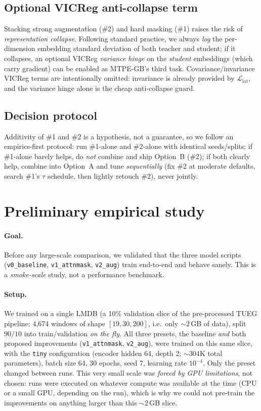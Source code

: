 \documentclass[11pt]{article}
\newcommand{\Llat}{\mathcal{L}_{\mathrm{lat}}}
\begin{document}
\subsection{Optional VICReg anti-collapse term}
Stacking strong augmentation (\#2) and hard masking (\#1) raises the risk of
\emph{representation collapse}. Following standard practice, we always
\emph{log} the per-dimension embedding standard deviation of both teacher and
student; if it collapses, an optional VICReg \emph{variance hinge} on the
\emph{student} embeddings (which carry gradient) can be enabled as MTPE-GB's third
task. Covariance/invariance VICReg terms are intentionally omitted: invariance is
already provided by \(\Llat\), and the variance hinge alone is the cheap
anti-collapse guard.

\subsection{Decision protocol}
Additivity of \#1 and \#2 is a hypothesis, not a guarantee, so we follow an
empirics-first protocol: run \#1-alone and \#2-alone with identical
seeds/splits; if \#1-alone barely helps, do \emph{not} combine and ship Option~B
(\#2); if both clearly help, combine into Option~A and tune \emph{sequentially}
(fix \#2 at moderate defaults, search \#1's \(\tau\) schedule, then lightly
retouch \#2), never jointly.

\section{Preliminary empirical study}
\label{sec:experiments}

\paragraph{Goal.} Before any large-scale comparison, we validated that the three
model scripts (\texttt{v0\_baseline}, \texttt{v1\_attnmask}, \texttt{v2\_aug})
train end-to-end and behave sanely. This is a \emph{smoke-scale} study, not a
performance benchmark.

\paragraph{Setup.} We trained on a single LMDB (a 10\% validation slice of the
pre-processed TUEG pipeline: 4{,}674 windows of shape \([19,30,200]\), i.e.\
only \(\sim\!2\)\,GB of data), split \(90/10\) into train/validation \emph{on the
fly}. All three presets, the baseline \emph{and} both proposed improvements
(\texttt{v1\_attnmask}, \texttt{v2\_aug}), were trained on this same slice, with
the \texttt{tiny} configuration (encoder hidden 64, depth 2; \(\sim\!304\)K total
parameters), batch size 64, 30 epochs, seed 7, learning rate \(10^{-4}\). Only the
preset changed between runs. This very small scale was \emph{forced by GPU
limitations}, not chosen: runs were executed on whatever compute was available at
the time (CPU or a small GPU, depending on the run), which is why we could not
pre-train the improvements on anything larger than this \(\sim\!2\)\,GB slice.
\end{document}
